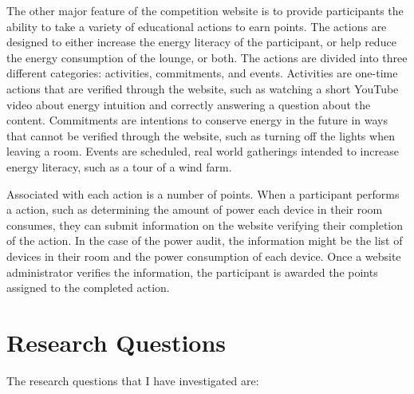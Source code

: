 The other major feature of the competition website is to provide participants the ability to take a variety of educational actions to earn points. The actions are designed to either increase the energy literacy of the participant, or help reduce the energy consumption of the lounge, or both. The actions are divided into three different categories: activities, commitments, and events. Activities are one-time actions that are verified through the website, such as watching a short YouTube video about energy intuition and correctly answering a question about the content. Commitments are intentions to conserve energy in the future in ways that cannot be verified through the website, such as turning off the lights when leaving a room. Events are scheduled, real world gatherings intended to increase energy literacy, such as a tour of a wind farm.

Associated with each action is a number of points. When a participant performs a action, such as determining the amount of power each device in their room consumes, they can submit information on the website verifying their completion of the action. In the case of the power audit, the information might be the list of devices in their room and the power consumption of each device. Once a website administrator verifies the information, the participant is awarded the points assigned to the completed action.


\section{Research Questions}

The research questions that I have investigated are:

